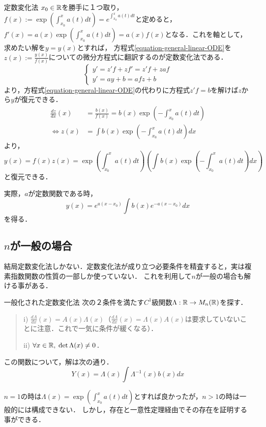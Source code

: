 \documentclass[uplatex,dvipdfmx]{jsreport}
\begin{document}
\begin{itembox}[l]{定数変化法}
    $x_0\in\mathbb{R}$を勝手に１つ取り，$f(x):=\exp\left( \int^x_{x_0}a(t)dt \right)=e^{\int^x_{x_0}a(t)dt}$と定めると，
$f'(x)=a(x)\exp\left( \int^x_{x_0}a(t)dt \right)=a(x)f(x)$となる．これを軸として，求めたい解を$y=y(x)$とすれば，
方程式\ref{equation-general-linear-ODE}を$z(x):=\frac{y(x)}{f(x)}$についての微分方程式に翻訳するのが定数変化法である．
\[\begin{cases}
    y' = z'f+zf' = z'f + zaf\\
    y' = ay + b = afz + b
\end{cases}\]
より，方程式\ref{equation-general-linear-ODE}の代わりに方程式$z'f=b$を解けば$z$から$y$が復元できる．
\begin{align*}
    \frac{dz}{dx}(x) &= \frac{b(x)}{f(x)} = b(x)\exp\left( -\int^x_{x_0}a(t)dt \right)\\
    \Leftrightarrow z(x) &= \int b(x)\exp\left( -\int^x_{x_0}a(t)dt \right)dx
\end{align*}
より，
\[y(x)=f(x)z(x)=\exp\left( \int^x_{x_0}a(t)dt \right)\left(\int b(x)\exp\left( -\int^x_{x_0}a(t)dt \right)dx\right)\]
と復元できる．
\end{itembox}
実際，$a$が定数関数である時，
\[ y(x) = e^{a(x-x_0)}\int b(x)e^{-a(x-x_0)}dx \]
を得る．

\subsection{$n$が一般の場合}

結局定数変化法しかない．定数変化法が成り立つ必要条件を精査すると，実は複素指数関数の性質の一部しか使っていない．
これを利用して$n$が一般の場合も解ける事がある．
\begin{itembox}[l]{一般化された定数変化法}
    次の２条件を満たす$C^1$級関数$\Lambda:\mathbb{R}\to M_n(\mathbb{R})$を探す．
    \begin{quotation}
        i) $\frac{d\Lambda}{dx}(x)=A(x)\Lambda(x)$（$\frac{d\Lambda}{dx}(x)=\Lambda(x)A(x)$は要求していないことに注意．これで一気に条件が緩くなる）．
        
        ii) $\forall x\in\mathbb{R},\; \det\Lambda(x)\ne 0$．
    \end{quotation}
    この関数について，解は次の通り．
    \[ Y(x) = \Lambda(x)\int\Lambda^{-1}(x)b(x)dx \]
\end{itembox}
$n=1$の時は$\Lambda(x)=\exp\left(\int^x_{x_0}a(t)dt\right)$とすれば良かったが，$n>1$の時は一般的には構成できない．
しかし，存在と一意性定理経由でその存在を証明する事ができる．
\end{document}
